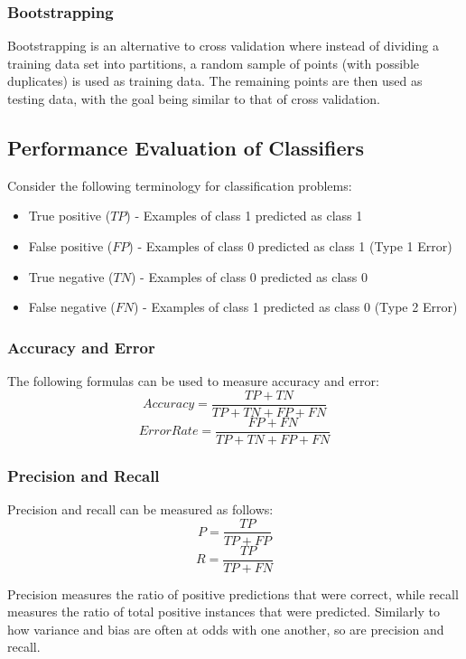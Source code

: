 \documentclass[12pt]{article}
\begin{document}
        \subsubsection{Bootstrapping}
            Bootstrapping is an alternative to cross validation where instead of dividing a training data set into partitions, a random sample of points
            (with possible duplicates) is used as training data. The remaining points are then used as testing data, with the goal being similar to
            that of cross validation.
    
    \subsection{Performance Evaluation of Classifiers}
        Consider the following terminology for classification problems:
        \begin{itemize}
            \item True positive ($TP$) - Examples of class 1 predicted as class 1
            \item False positive ($FP$) - Examples of class 0 predicted as class 1 (Type 1 Error)
            \item True negative ($TN$) - Examples of class 0 predicted as class 0
            \item False negative ($FN$) - Examples of class 1 predicted as class 0 (Type 2 Error)
        \end{itemize}
    
        \subsubsection{Accuracy and Error}
            The following formulas can be used to measure accuracy and error:
            $$Accuracy = \frac{TP + TN}{TP + TN + FP + FN}$$
            $$ErrorRate = \frac{FP + FN}{TP + TN + FP + FN}$$
    
        \subsubsection{Precision and Recall}
            Precision and recall can be measured as follows:
            $$P = \frac{TP}{TP + FP}$$
            $$R = \frac{TP}{TP + FN}$$
    
            Precision measures the ratio of positive predictions that were correct, while recall measures the ratio of total positive instances that were
            predicted. Similarly to how variance and bias are often at odds with one another, so are precision and recall.
    
\end{document}
